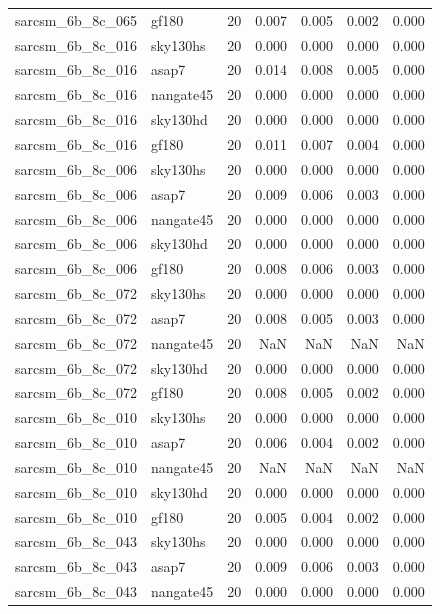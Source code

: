 \begin{tabular}{llrrrrr}
sarcsm\_6b\_8c\_065 & gf180 & 20 & 0.007 & 0.005 & 0.002 & 0.000 \\
sarcsm\_6b\_8c\_016 & sky130hs & 20 & 0.000 & 0.000 & 0.000 & 0.000 \\
sarcsm\_6b\_8c\_016 & asap7 & 20 & 0.014 & 0.008 & 0.005 & 0.000 \\
sarcsm\_6b\_8c\_016 & nangate45 & 20 & 0.000 & 0.000 & 0.000 & 0.000 \\
sarcsm\_6b\_8c\_016 & sky130hd & 20 & 0.000 & 0.000 & 0.000 & 0.000 \\
sarcsm\_6b\_8c\_016 & gf180 & 20 & 0.011 & 0.007 & 0.004 & 0.000 \\
sarcsm\_6b\_8c\_006 & sky130hs & 20 & 0.000 & 0.000 & 0.000 & 0.000 \\
sarcsm\_6b\_8c\_006 & asap7 & 20 & 0.009 & 0.006 & 0.003 & 0.000 \\
sarcsm\_6b\_8c\_006 & nangate45 & 20 & 0.000 & 0.000 & 0.000 & 0.000 \\
sarcsm\_6b\_8c\_006 & sky130hd & 20 & 0.000 & 0.000 & 0.000 & 0.000 \\
sarcsm\_6b\_8c\_006 & gf180 & 20 & 0.008 & 0.006 & 0.003 & 0.000 \\
sarcsm\_6b\_8c\_072 & sky130hs & 20 & 0.000 & 0.000 & 0.000 & 0.000 \\
sarcsm\_6b\_8c\_072 & asap7 & 20 & 0.008 & 0.005 & 0.003 & 0.000 \\
sarcsm\_6b\_8c\_072 & nangate45 & 20 & NaN & NaN & NaN & NaN \\
sarcsm\_6b\_8c\_072 & sky130hd & 20 & 0.000 & 0.000 & 0.000 & 0.000 \\
sarcsm\_6b\_8c\_072 & gf180 & 20 & 0.008 & 0.005 & 0.002 & 0.000 \\
sarcsm\_6b\_8c\_010 & sky130hs & 20 & 0.000 & 0.000 & 0.000 & 0.000 \\
sarcsm\_6b\_8c\_010 & asap7 & 20 & 0.006 & 0.004 & 0.002 & 0.000 \\
sarcsm\_6b\_8c\_010 & nangate45 & 20 & NaN & NaN & NaN & NaN \\
sarcsm\_6b\_8c\_010 & sky130hd & 20 & 0.000 & 0.000 & 0.000 & 0.000 \\
sarcsm\_6b\_8c\_010 & gf180 & 20 & 0.005 & 0.004 & 0.002 & 0.000 \\
sarcsm\_6b\_8c\_043 & sky130hs & 20 & 0.000 & 0.000 & 0.000 & 0.000 \\
sarcsm\_6b\_8c\_043 & asap7 & 20 & 0.009 & 0.006 & 0.003 & 0.000 \\
sarcsm\_6b\_8c\_043 & nangate45 & 20 & 0.000 & 0.000 & 0.000 & 0.000 \\

\end{tabular}
